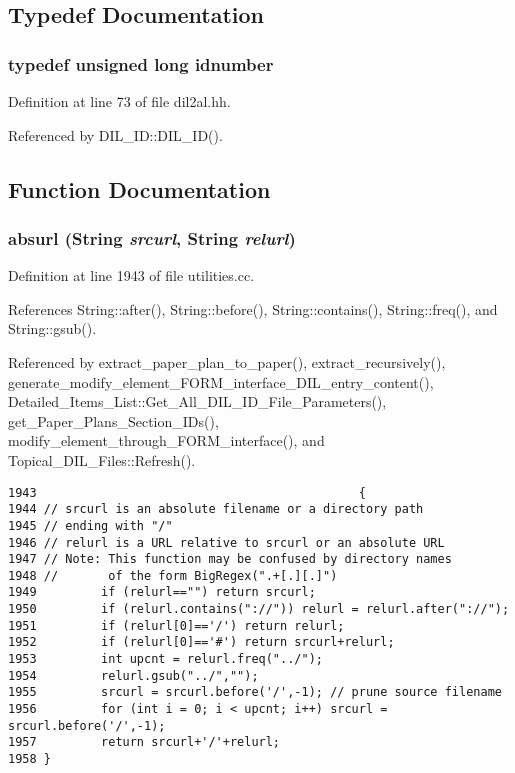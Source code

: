 \subsection{Typedef Documentation}
\subsubsection{\setlength{\rightskip}{0pt plus 5cm}typedef unsigned long idnumber}\label{dil2al_8hh_a109}




Definition at line 73 of file dil2al.hh.

Referenced by DIL\_\-ID::DIL\_\-ID().

\subsection{Function Documentation}
\subsubsection{ absurl ({\bf String} {\em srcurl}, {\bf String} {\em relurl})}\label{dil2al_8hh_a229}




Definition at line 1943 of file utilities.cc.

References String::after(), String::before(), String::contains(), String::freq(), and String::gsub().

Referenced by extract\_\-paper\_\-plan\_\-to\_\-paper(), extract\_\-recursively(), generate\_\-modify\_\-element\_\-FORM\_\-interface\_\-DIL\_\-entry\_\-content(), Detailed\_\-Items\_\-List::Get\_\-All\_\-DIL\_\-ID\_\-File\_\-Parameters(), get\_\-Paper\_\-Plans\_\-Section\_\-IDs(), modify\_\-element\_\-through\_\-FORM\_\-interface(), and Topical\_\-DIL\_\-Files::Refresh().



\footnotesize\begin{verbatim}1943                                             {
1944 // srcurl is an absolute filename or a directory path
1945 // ending with "/"
1946 // relurl is a URL relative to srcurl or an absolute URL
1947 // Note: This function may be confused by directory names
1948 //       of the form BigRegex(".+[.][.]")
1949         if (relurl=="") return srcurl;
1950         if (relurl.contains("://")) relurl = relurl.after("://");
1951         if (relurl[0]=='/') return relurl;
1952         if (relurl[0]=='#') return srcurl+relurl;
1953         int upcnt = relurl.freq("../");
1954         relurl.gsub("../","");
1955         srcurl = srcurl.before('/',-1); // prune source filename
1956         for (int i = 0; i < upcnt; i++) srcurl = srcurl.before('/',-1);
1957         return srcurl+'/'+relurl;
1958 }
\end{verbatim}\normalsize 
{}
